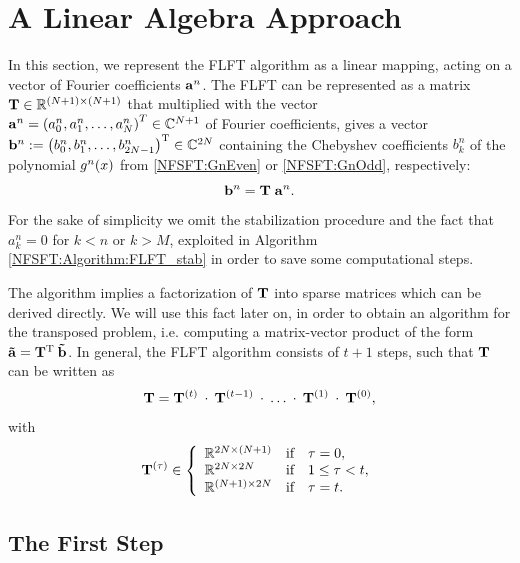 \section{A Linear Algebra Approach}
\label{DSFT:LinearAlgebra}

In this section, we represent the FLFT algorithm as a linear mapping, acting on a vector of Fourier coefficients $\mathbf{a}^n$. 
The FLFT can be represented as a matrix $\mathbf{T} \in \mathbb{R}^{(N+1) \times (N+1)}$ that multiplied with the vector 
$\mathbf{a}^n = \left(a_0^n,a_1^n,\dots,a_N^n\right)^T \in \mathbb{C}^{N+1}$ of Fourier coefficients, gives a vector 
$\mathbf{b}^n := \left(b_0^n,b_1^n,\dots,b_{2N-1}^n\right)^{\text{\rm{T}}} \in \mathbb{C}^{2N}$ containing the Chebyshev coefficients 
$b_{k}^n$ of the polynomial $g^n{\hspace{-0.4ex}}\left(x\right)$ from \eqref{NFSFT:GnEven} or \eqref{NFSFT:GnOdd}, respectively: 
\[\mathbf{b}^{n} = \mathbf{T} \; \mathbf{a}^n.\] 
For the sake of simplicity we omit the stabilization procedure and the fact that $a_{k}^n = 0$ for $k < n$ or $k > M$, 
exploited in Algorithm \ref{NFSFT:Algorithm:FLFT_stab} in order to save some computational steps.

The algorithm implies a factorization of $\mathbf{T}$ into sparse matrices which can be derived directly.
We will use this fact later on, in order to obtain an algorithm for the transposed problem, i.e. computing 
a matrix-vector product of the form $\mathbf{\tilde{a}} = \mathbf{T}^{\text{\rm{T}}}\:\mathbf{\tilde{b}}$. In general, the FLFT algorithm consists 
of $t+1$ steps, such that $\mathbf{T}$ can be written as 
\[
  \mathbf{T} = \mathbf{T}^{(t)} \: \cdot \:  \mathbf{T}^{(t-1)} \: \cdot \: \dots \: \cdot \: \mathbf{T}^{(1)} \: \cdot \:  \mathbf{T}^{(0)},
\]
with
\[
 \V{T}^{(\tau)} \in \left\{\begin{array}{l@{\quad \text{if} \quad}l} \R^{2N \times (N+1)} & \tau = 0, \\ \R^{2N \times 2N} & 1 \le \tau < t, \\ \R^{(N+1) \times 2N} & \tau = t. \end{array}\right.
\]

\subsection{The First Step}

